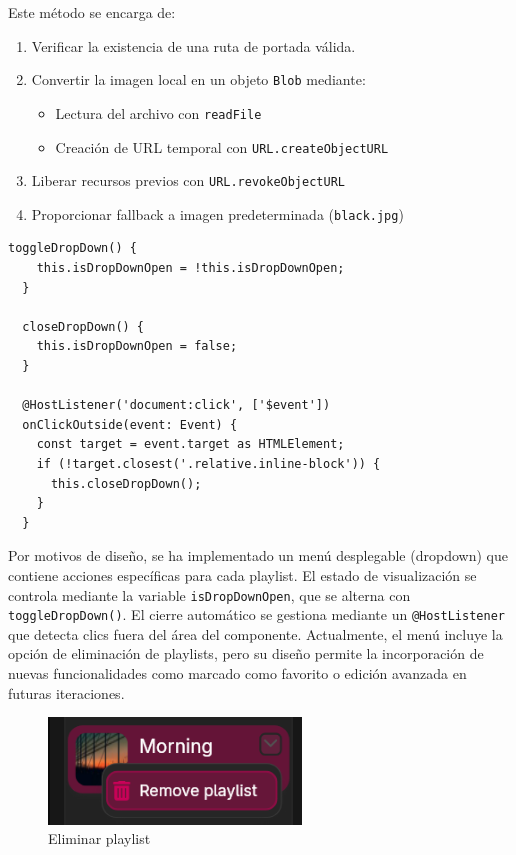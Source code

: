 \documentclass[11pt, a4paper]{article}
\begin{document}
                Este método se encarga de:
                \begin{enumerate}
                    \item Verificar la existencia de una ruta de portada válida.
                    \item Convertir la imagen local en un objeto \texttt{Blob} mediante:
                    \begin{itemize}
                        \item Lectura del archivo con \texttt{readFile}
                        \item Creación de URL temporal con \texttt{URL.createObjectURL}
                    \end{itemize}
                    \item Liberar recursos previos con \texttt{URL.revokeObjectURL}
                    \item Proporcionar fallback a imagen predeterminada (\texttt{black.jpg})
                \end{enumerate}

                \begin{lstlisting}[caption={Dropdown}]
toggleDropDown() {
    this.isDropDownOpen = !this.isDropDownOpen;
  }

  closeDropDown() {
    this.isDropDownOpen = false;
  }

  @HostListener('document:click', ['$event'])
  onClickOutside(event: Event) {
    const target = event.target as HTMLElement;
    if (!target.closest('.relative.inline-block')) {
      this.closeDropDown();
    }
  }
                \end{lstlisting}

                Por motivos de diseño, se ha implementado un menú desplegable (dropdown) que contiene acciones específicas para cada playlist. El estado de visualización se controla mediante la variable \texttt{isDropDownOpen}, que se alterna con \texttt{toggleDropDown()}. El cierre automático se gestiona mediante un \texttt{@HostListener} que detecta clics fuera del área del componente. Actualmente, el menú incluye la opción de eliminación de playlists, pero su diseño permite la incorporación de nuevas funcionalidades como marcado como favorito o edición avanzada en futuras iteraciones.

                \begin{figure}[H]
                    \centering
                    \includegraphics[width=0.6\textwidth]{media/screenshots/remove_playlist.png}
                    \caption{Eliminar playlist}
                    \label{fig:eliminar playlist}
                \end{figure}
\end{document}
